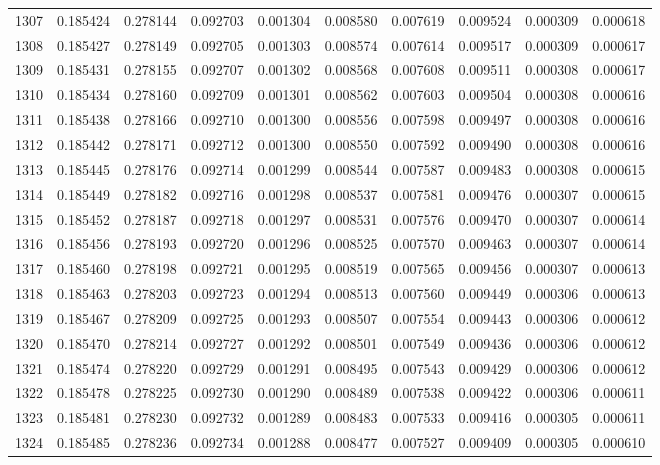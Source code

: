 \begin{tabular}{lrrrrrrrrr}
1307 & 0.185424 & 0.278144 & 0.092703 & 0.001304 & 0.008580 & 0.007619 & 0.009524 & 0.000309 & 0.000618 \\
1308 & 0.185427 & 0.278149 & 0.092705 & 0.001303 & 0.008574 & 0.007614 & 0.009517 & 0.000309 & 0.000617 \\
1309 & 0.185431 & 0.278155 & 0.092707 & 0.001302 & 0.008568 & 0.007608 & 0.009511 & 0.000308 & 0.000617 \\
1310 & 0.185434 & 0.278160 & 0.092709 & 0.001301 & 0.008562 & 0.007603 & 0.009504 & 0.000308 & 0.000616 \\
1311 & 0.185438 & 0.278166 & 0.092710 & 0.001300 & 0.008556 & 0.007598 & 0.009497 & 0.000308 & 0.000616 \\
1312 & 0.185442 & 0.278171 & 0.092712 & 0.001300 & 0.008550 & 0.007592 & 0.009490 & 0.000308 & 0.000616 \\
1313 & 0.185445 & 0.278176 & 0.092714 & 0.001299 & 0.008544 & 0.007587 & 0.009483 & 0.000308 & 0.000615 \\
1314 & 0.185449 & 0.278182 & 0.092716 & 0.001298 & 0.008537 & 0.007581 & 0.009476 & 0.000307 & 0.000615 \\
1315 & 0.185452 & 0.278187 & 0.092718 & 0.001297 & 0.008531 & 0.007576 & 0.009470 & 0.000307 & 0.000614 \\
1316 & 0.185456 & 0.278193 & 0.092720 & 0.001296 & 0.008525 & 0.007570 & 0.009463 & 0.000307 & 0.000614 \\
1317 & 0.185460 & 0.278198 & 0.092721 & 0.001295 & 0.008519 & 0.007565 & 0.009456 & 0.000307 & 0.000613 \\
1318 & 0.185463 & 0.278203 & 0.092723 & 0.001294 & 0.008513 & 0.007560 & 0.009449 & 0.000306 & 0.000613 \\
1319 & 0.185467 & 0.278209 & 0.092725 & 0.001293 & 0.008507 & 0.007554 & 0.009443 & 0.000306 & 0.000612 \\
1320 & 0.185470 & 0.278214 & 0.092727 & 0.001292 & 0.008501 & 0.007549 & 0.009436 & 0.000306 & 0.000612 \\
1321 & 0.185474 & 0.278220 & 0.092729 & 0.001291 & 0.008495 & 0.007543 & 0.009429 & 0.000306 & 0.000612 \\
1322 & 0.185478 & 0.278225 & 0.092730 & 0.001290 & 0.008489 & 0.007538 & 0.009422 & 0.000306 & 0.000611 \\
1323 & 0.185481 & 0.278230 & 0.092732 & 0.001289 & 0.008483 & 0.007533 & 0.009416 & 0.000305 & 0.000611 \\
1324 & 0.185485 & 0.278236 & 0.092734 & 0.001288 & 0.008477 & 0.007527 & 0.009409 & 0.000305 & 0.000610 \\

\end{tabular}
